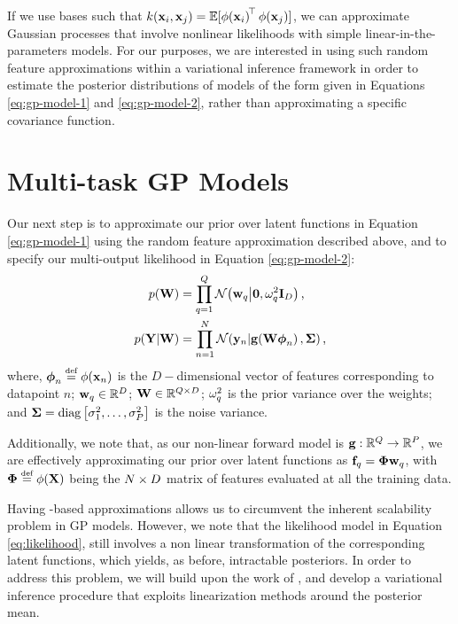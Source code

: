 If we use \rks bases  such that
$k\!\left({{\mathbf{x}_i}, {\mathbf{x}_j}}\right) = 
\mathbb{E}[\phi\!\left({{\mathbf{x}_i}}\right)^{\!\top}\phi\!\left({{\mathbf{x}_j}}\right)]$, we can
approximate Gaussian processes that involve nonlinear likelihoods 
with simple linear-in-the-parameters models. 
For our purposes, we are 
interested in using such random feature approximations within a variational inference 
framework in order to estimate the posterior distributions of models of the form given
in Equations \eqref{eq:gp-model-1} and \eqref{eq:gp-model-2}, rather than
approximating a specific covariance function.
%
\section{Multi-task GP Models}
 Our next step is to approximate our prior over latent functions in Equation \eqref{eq:gp-model-1} 
 using the random feature approximation described above, and to specify 
 our multi-output likelihood in Equation \eqref{eq:gp-model-2}:
 \begin{align}
 \label{eq:prior}
 p(\mathbf{W}) &=  \prod^Q_{q=1} \mathcal{N}\!\left({\mathbf{w}_q}\middle\vert{\mathbf{0}, \ensuremath{\omega^2}_q \ensuremath{\mathbf{I}_{D}}}\right) \text{,} \\
  \label{eq:likelihood}
    p\!\left({\mathbf{Y} }\middle\vert{\ensuremath{\mathbf{W}}}\right) &=
        \prod^N_{n=1} \mathcal{N}\!\left({\mathbf{y}_n}\middle\vert{\ensuremath{\mathbf{g}\!\left({{\mathbf{W}\boldsymbol\phi_n}}\right)}, \ensuremath{\mathbf{\Sigma}}}\right)  \text{,}
\end{align}
%
where,  $\feats_n \defeq \featfunc{\ins_n}$  is the 
 $D-$dimensional vector of features corresponding to datapoint $n$; 
$\mathbf{w}_q \in \mathbb{R}^{D}$;
 $\mathbf{W} \in \mathbb{R}^{Q   \times D}$;
$\omega^2_q$ is the prior variance over the weights; 
 and $\mathbf{\Sigma} = \operatorname{diag}{\left[{\sigma^2_1, \ldots, \sigma^2_P}\right]}$ is the  
 noise variance. 
 
Additionally, we note that, as our non-linear
forward model  is $\mathbf{g} : \mathbb{R}^{Q} \to \mathbb{R}^{P}$,  
we are effectively  approximating our prior over latent functions as 
 $\mathbf{f}_q = \boldsymbol\Phi\mathbf{w}_q$, with  $\Feats \defeq \featfunc{\Ins}$
 being the $N \times D$  matrix of features evaluated at all the training data. 
 
Having \rks-based approximations allows us to circumvent the inherent
scalability problem in GP models. However, we note that the likelihood model 
in Equation  \eqref{eq:likelihood}, still involves a non linear transformation 
of the corresponding latent functions, which yields, as before, intractable posteriors. 
In order to address this problem, we will build upon the work of 
\citet{steinberg-bonilla-nips-2014}, and develop a variational inference procedure 
that exploits linearization methods around the posterior mean.



